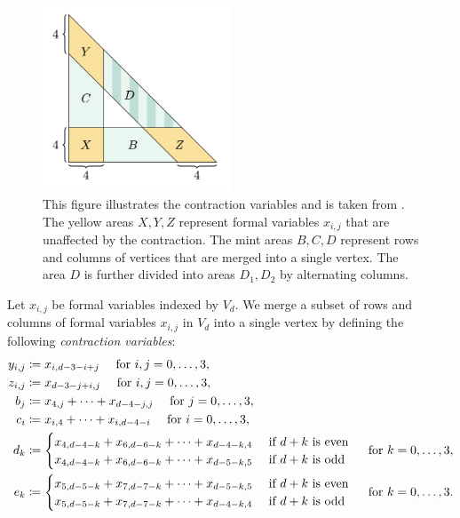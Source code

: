 \begin{figure}[H]\label{fig:contractions-42342432}
    \centering
    \includegraphics[width=0.5\textwidth]{assets/contactions-4.png}
    \caption{This figure illustrates the contraction variables and is taken from \cite{bik2022classifying}. The yellow areas \( X, Y, Z \) represent formal variables \( x_{i,j} \) that are unaffected by the contraction. The mint areas \( B, C, D \) represent rows and columns of vertices that are merged into a single vertex. The area \( D \) is further divided into areas \( D_1, D_2 \) by alternating columns.}
\end{figure}

\begin{definition}\label{def:contraction-variables}
Let \( x_{i,j} \) be formal variables indexed by \( V_d \). We merge a subset of rows and columns of formal variables \( x_{i,j} \) in \( V_d \) into a single vertex by defining the following \emph{contraction variables}:
\begin{align*}
    y_{i,j} &\coloneqq x_{i, d-3-i+j} \quad \text{ for } i,j = 0, \dots, 3, \\
    z_{i,j} &\coloneqq x_{d-3-j+i,j} \quad \text{ for } i,j = 0, \dots, 3, \\
    b_j &\coloneqq x_{4,j} + \dots + x_{d-4-j,j} \quad \text{ for } j = 0, \dots, 3, \\
    c_i &\coloneqq x_{i,4} + \dots + x_{i,d-4-i} \quad \text{ for } i = 0, \dots, 3, \\
    d_k &\coloneqq \begin{cases}
        x_{4,d-4-k} + x_{6,d-6-k} + \dots + x_{d-4-k,4} & \text{ if \( d + k \) is even} \\
        x_{4,d-4-k} + x_{6,d-6-k} + \dots + x_{d-5-k,5} & \text{ if \( d + k \) is odd}
    \end{cases} \quad \text{ for } k = 0, \dots, 3, \\
    e_k &\coloneqq \begin{cases}
        x_{5,d-5-k} + x_{7,d-7-k} + \dots + x_{d-5-k,5} & \text{ if \( d + k \) is even} \\
        x_{5,d-5-k} + x_{7,d-7-k} + \dots + x_{d-4-k,4} & \text{ if \( d + k \) is odd}
    \end{cases} \quad \text{ for } k = 0, \dots, 3.
\end{align*}
\end{definition}

